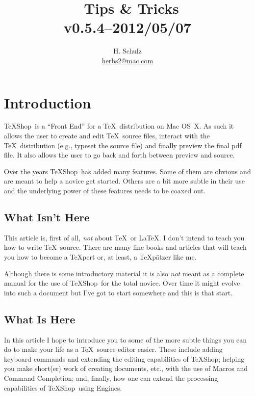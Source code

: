 \documentclass[letterpaper,11pt]{article}
\title{\TS\ Tips \& Tricks\\\small v0.5.4--2012/05/07}
\author{H. Schulz\\\small\href{mailto:herbs2@mac.com}{herbs2@mac.com}}
\date{}
\newcommand{\TS}{\textsf{\TeX Shop}}
\newcommand{\acr}[1]{\textsf{#1}}
\begin{document}
\maketitle

\tableofcontents

\newpage

\section{Introduction}

\TS\ is a ``Front End'' for a \TeX\ distribution on Mac OS~X. As such it allows the user to create and edit \TeX\ source files, interact with the \TeX\ distribution (e.g., typeset the source file) and finally preview the final \acr{pdf} file. It also allows the user to go back and forth between preview and source.

Over the years \TS\ has added many features. Some of them are obvious and are meant to help a novice get started. Others are a bit more subtle in their use and the underlying power of these features needs to be coaxed out.

\subsection{What Isn't Here}

This article is, first of all, \emph{not} about \TeX\ or \LaTeX. I don't intend to teach you how to write \TeX\ source. There are many fine books and articles that will teach you how to become a \TeX pert or, at least, a \TeX pätzer like me.

Although there is some introductory material it is also \emph{not} meant as a complete manual for the use of \TS\ for the total novice. Over time it might evolve into such a document but I've got to start somewhere and this is that start.

\subsection{What Is Here}

In this article I hope to introduce you to some of the more subtle things you can do to make your life as a \TeX\ source editor easier. These include adding keyboard commands and extending the editing capabilities of \TS; helping you make short(er) work of creating documents, etc., with the use of Macros and Command Completion; and, finally, how one can extend the processing capabilities of \TS\ using Engines.
\end{document}
